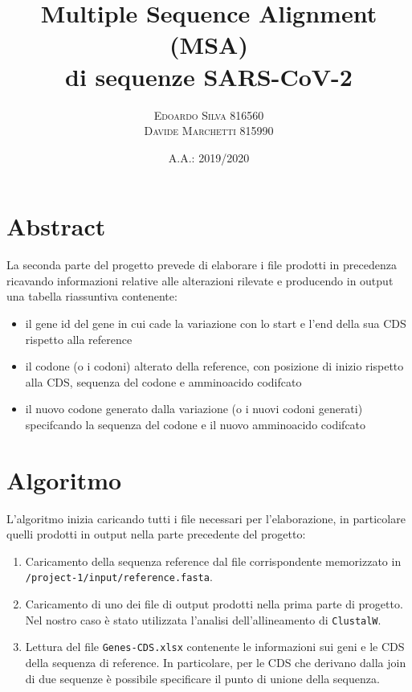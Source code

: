 \documentclass[11pt,italian]{article}
\title{Multiple Sequence Alignment (MSA) \\ di sequenze SARS-CoV-2}
\date{A.A.: 2019/2020}
\author{
    \textsc{Edoardo Silva} 816560 \\
    \textsc{Davide Marchetti} 815990
}
\begin{document}
\maketitle

\section{Abstract}
La seconda parte del progetto prevede di elaborare i file prodotti in precedenza ricavando informazioni relative alle alterazioni rilevate e producendo in output una tabella riassuntiva contenente:
\begin{itemize}
  \item il gene id del gene in cui cade la variazione con lo start e l'end della sua CDS rispetto alla reference
  \item il codone (o i codoni) alterato della reference, con posizione di inizio rispetto alla CDS, sequenza del codone e amminoacido codifcato
  \item il nuovo codone generato dalla variazione (o i nuovi codoni generati) specifcando la sequenza del codone e il nuovo amminoacido codifcato
\end{itemize}

\newpage
\section{Algoritmo}
L'algoritmo inizia caricando tutti i file necessari per l'elaborazione, in particolare quelli prodotti in output nella parte precedente del progetto:
\begin{enumerate}
  \item Caricamento della sequenza reference dal file corrispondente memorizzato in \lstinline{/project-1/input/reference.fasta}.
  \item Caricamento di uno dei file di output prodotti nella prima parte di progetto. Nel nostro caso è stato utilizzata l'analisi dell'allineamento di \lstinline{ClustalW}.
  \item Lettura del file \lstinline{Genes-CDS.xlsx} contenente le informazioni sui geni e le CDS della sequenza di reference. In particolare, per le CDS che derivano dalla join di due sequenze è possibile specificare il punto di unione della sequenza.
\end{enumerate}
\end{document}
